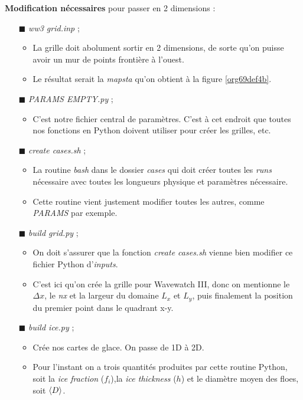 \documentclass[10pt]{article}
\numberwithin{equation}{section}
\renewcommand{\boxtimes}{\blacksquare}
\begin{document}
\textbf{Modification nécessaires} pour passer en 2 dimensions : 
\begin{itemize}
\item[{$\boxtimes$}] \emph{ww3 grid.inp} ;
\begin{itemize}
\item La grille doit abolument sortir en 2 dimensions, de sorte qu'on puisse avoir un mur de points frontière à l'ouest.
\item Le résultat serait la \emph{mapsta} qu'on obtient à la figure \ref{org69def4b}.
\end{itemize}
\item[{$\boxtimes$}] \emph{PARAMS EMPTY.py} ;
\begin{itemize}
\item C'est notre fichier central de paramètres. C'est à cet endroit que toutes nos fonctions en Python doivent utiliser pour créer les grilles, etc.
\end{itemize}
\item[{$\boxtimes$}] \emph{create cases.sh} ;
\begin{itemize}
\item La routine \emph{bash} dans le dossier \emph{cases} qui doit créer toutes les \emph{runs} nécessaire avec toutes les longueurs physique et paramètres nécessaire.
\item Cette routine vient justement modifier toutes les autres, comme \emph{PARAMS} par exemple.
\end{itemize}
\item[{$\boxtimes$}] \emph{build grid.py} ;
\begin{itemize}
\item On doit s'assurer que la fonction \emph{create cases.sh} vienne bien modifier ce fichier Python d'\emph{inputs}.
\item C'est ici qu'on crée la grille pour Wavewatch III, donc on mentionne le \(\Delta x\), le \emph{nx} et la largeur du domaine \(L_x\) et \(L_y\), puis finalement la position du premier point dans le quadrant x-y.
\end{itemize}
\item[{$\boxtimes$}] \emph{build ice.py} ;
\begin{itemize}
\item Crée nos cartes de glace. On passe de 1D à 2D.
\item Pour l'instant on a trois quantités produites par cette routine Python, soit la \emph{ice fraction} (\(f_i\)),la \emph{ice thickness} (\(h\)) et le diamètre moyen des floes, soit \(\expval{D}\).

\end{itemize}
\end{itemize}
\end{document}
